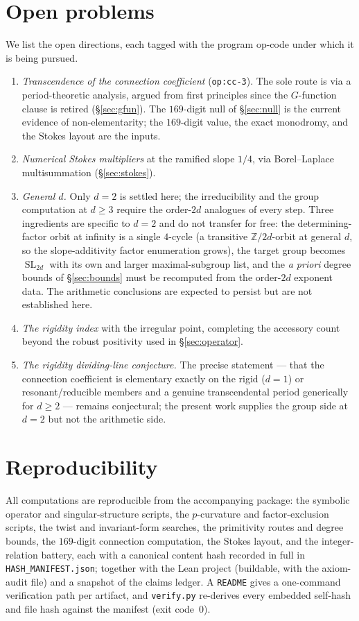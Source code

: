 \documentclass[11pt,reqno]{amsart}
\theoremstyle{plain}
\theoremstyle{definition}
\theoremstyle{remark}
\newcommand{\Z}{\mathbb{Z}}
\newcommand{\SL}{\operatorname{SL}}
\begin{document}
\section{Open problems}\label{sec:open}

We list the open directions, each tagged with the program op-code under which
it is being pursued.
\begin{enumerate}
\item \emph{Transcendence of the connection coefficient} (\texttt{op:cc-3}).
The sole route is via a period-theoretic analysis, argued from first principles since
the $G$-function clause is retired (\S\ref{sec:gfun}). The $169$-digit null of
\S\ref{sec:null} is the current evidence of non-elementarity; the
$169$-digit value, the exact monodromy, and the Stokes layout are the inputs.
\item \emph{Numerical Stokes multipliers} at the ramified slope $1/4$, via
Borel--Laplace multisummation (\S\ref{sec:stokes}).
\item \emph{General $d$.} Only $d=2$ is settled here; the irreducibility and
the group computation at $d\ge3$ require the order-$2d$ analogues of every step.
Three ingredients are specific to $d=2$ and do not transfer for free: the
determining-factor orbit at infinity is a single $4$-cycle (a transitive
$\Z/2d$-orbit at general $d$, so the slope-additivity factor enumeration grows),
the target group becomes $\SL_{2d}$ with its own and larger maximal-subgroup
list, and the \emph{a priori} degree bounds of \S\ref{sec:bounds} must be
recomputed from the order-$2d$ exponent data. The arithmetic conclusions are
expected to persist but are not established here.
\item \emph{The rigidity index} with the irregular point, completing the
accessory count beyond the robust positivity used in
\S\ref{sec:operator}.
\item \emph{The rigidity dividing-line conjecture.} The precise statement ---
that the connection coefficient is elementary exactly on the rigid ($d=1$) or
resonant/reducible members and a genuine transcendental period generically for
$d\ge2$ --- remains conjectural; the present work supplies the group side at
$d=2$ but not the arithmetic side.
\end{enumerate}

\section*{Reproducibility}
All computations are reproducible from the accompanying package: the symbolic
operator and singular-structure scripts, the $p$-curvature and factor-exclusion
scripts, the twist and invariant-form searches, the primitivity routes and
degree bounds, the $169$-digit connection computation, the Stokes layout, and
the integer-relation battery, each with a canonical content hash recorded in
full in \texttt{HASH\_MANIFEST.json}; together with
the Lean project (buildable, with the axiom-audit file) and a snapshot of the
claims ledger. A \texttt{README} gives a one-command verification path per
artifact, and \texttt{verify.py} re-derives every embedded self-hash and file
hash against the manifest (exit code~$0$).
\end{document}
